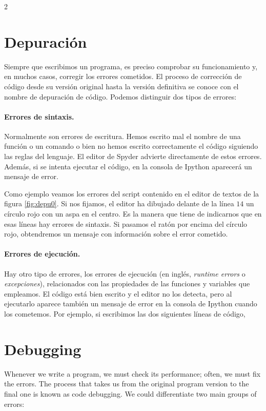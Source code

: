 \begin{paracol}{2}
\section{Depuración}
Siempre que escribimos un programa, es preciso comprobar su funcionamiento y, en  muchos casos, corregir los errores cometidos. El proceso de corrección de código desde su versión original hasta la versión definitiva se conoce con el nombre de depuración de código. Podemos distinguir dos tipos de errores:

\paragraph{Errores de sintaxis.} Normalmente son errores de escritura. Hemos escrito mal el nombre de una función o un comando o bien no hemos escrito correctamente el código siguiendo las reglas del lenguaje. El editor de Spyder advierte directamente de estos errores. Además, si se intenta ejecutar el código, en la consola de Ipython aparecerá un mensaje de error. 

Como ejemplo veamos los errores del script contenido  en el editor de textos de la figura \ref{fig:depu0}. Si nos fijamos, el editor ha dibujado delante de la línea $14$ un círculo rojo con un aspa en el centro. Es la manera que tiene de indicarnos que en esas líneas hay errores de sintaxis. Si pasamos el ratón por encima del círculo rojo, obtendremos un mensaje con información sobre el error cometido.

\paragraph{Errores de ejecución.} Hay otro tipo de errores, los errores de ejecución (en inglés, \emph{runtime errors} o \emph{excepciones}), relacionados con las propiedades de las funciones y variables que empleamos. El código está bien escrito y el editor no los detecta, pero al ejecutarlo aparece también un mensaje de error en la consola de Ipython cuando los cometemos. Por ejemplo, si escribimos las dos siguientes líneas de código,
\switchcolumn
\section[Debugging]{Debugging}
Whenever we write a program, we must check its performance; often, we must fix the errors. The process that takes us from the original program version to the final one is known as code debugging. We could differentiate two main groups of errors:


\end{paracol}
